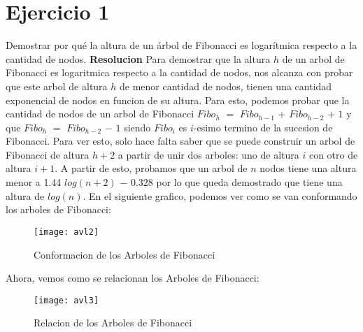 \documentclass[10pt,a4paper]{article}
\begin{document}
\maketitle

\section{Ejercicio 1}

Demostrar por qué la altura de un árbol de Fibonacci es logarítmica respecto a la cantidad de nodos.
\newline
\newline
\textbf{Resolucion}
\newline
\newline
Para demostrar que la altura $h$ de un arbol de Fibonacci es logaritmica respecto a la cantidad de nodos, nos alcanza con probar que este arbol de altura $h$ de menor cantidad de nodos, tienen una cantidad exponencial de nodos en funcion de su altura. 
\newline
\newline
Para esto, podemos probar que la cantidad de nodos de un arbol de Fibonacci $Fibo_{h}$ $=$ $Fibo_{h-1}$ $+$ $Fibo_{h-2}$ $+$ $1$ y que 
\newline
$Fibo_{h}$ $=$ $Fibo_{h-2}$ $-$ $1$ siendo $Fibo_{i}$ es $i$-esimo termino de la sucesion de Fibonacci. Para ver esto, solo hace falta saber que se puede construir un arbol de Fibonacci de altura $h+2$ a partir de unir dos arboles: uno de altura $i$ con otro de altura $i+1$. A partir de esto, probamos que un arbol de $n$ nodos tiene una altura menor a 1.44 $log(n+2)$ $-$ $0.328$ por lo que queda demostrado que tiene una altura de $log(n)$.     
\newline
\newline
En el siguiente grafico, podemos ver como se van conformando los arboles de Fibonacci:

\begin{figure}[h]
\centering
\texttt{[image: avl2]}%
\caption{Conformacion de los Arboles de Fibonacci}
\label{drivers1}
\end{figure}

Ahora, vemos como se relacionan los Arboles de Fibonacci:

\begin{figure}[h]
	\centering
	\texttt{[image: avl3]}%
	\caption{Relacion de los Arboles de Fibonacci}
	\label{drivers1}
\end{figure}
\newpage
\end{document}
